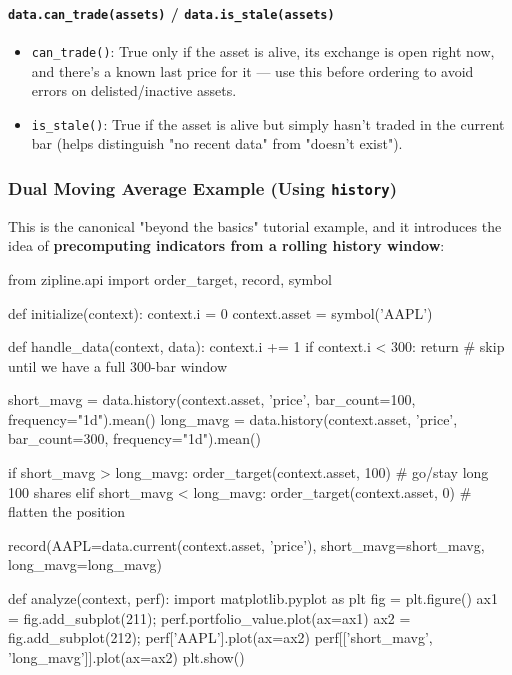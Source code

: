 \documentclass[12pt,openany]{book}
\theoremstyle{definition}
\theoremstyle{remark}
\begin{document}
\paragraph{\texttt{data.can\_trade(assets)} / \texttt{data.is\_stale(assets)}}

\begin{itemize}
\item 
\texttt{can\_trade()}: True only if the asset is alive, its exchange is open right now, and there's a known last price for it — use this before ordering to avoid errors on delisted/inactive assets.

\item 
\texttt{is\_stale()}: True if the asset is alive but simply hasn't traded in the current bar (helps distinguish "no recent data" from "doesn't exist").

\end{itemize}
\subsubsection{Dual Moving Average Example (Using \texttt{history})}

This is the canonical "beyond the basics" tutorial example, and it introduces the idea of \textbf{precomputing indicators from a rolling history window}:

\begin{python}
from zipline.api import order_target, record, symbol

def initialize(context):
    context.i = 0
    context.asset = symbol('AAPL')

def handle_data(context, data):
    context.i += 1
    if context.i < 300:
        return  # skip until we have a full 300-bar window

    short_mavg = data.history(context.asset, 'price', bar_count=100, frequency="1d").mean()
    long_mavg  = data.history(context.asset, 'price', bar_count=300, frequency="1d").mean()

    if short_mavg > long_mavg:
        order_target(context.asset, 100)   # go/stay long 100 shares
    elif short_mavg < long_mavg:
        order_target(context.asset, 0)     # flatten the position

    record(AAPL=data.current(context.asset, 'price'),
           short_mavg=short_mavg, long_mavg=long_mavg)

def analyze(context, perf):
    import matplotlib.pyplot as plt
    fig = plt.figure()
    ax1 = fig.add_subplot(211); perf.portfolio_value.plot(ax=ax1)
    ax2 = fig.add_subplot(212); perf['AAPL'].plot(ax=ax2)
    perf[['short_mavg', 'long_mavg']].plot(ax=ax2)
    plt.show()
\end{python}
\end{document}
